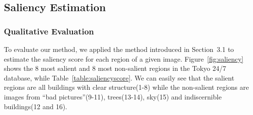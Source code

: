 \subsection{Saliency Estimation}
\subsubsection{Qualitative Evaluation}
\par
To evaluate our method, we applied the method introduced in Section~3.1 to estimate the saliency score for each region of a given image. Figure~\ref{fig:saliency} shows the 8 most salient and 8 most non-salient regions in the Tokyo 24/7 database, while Table~\ref{table:saliencyscore}. We can easily see that the salient regions are all buildings with clear structure(1-8) while the non-salient regions are images from ``bad pictures''(9-11), trees(13-14), sky(15) and indiscernible buildings(12 and 16). 
